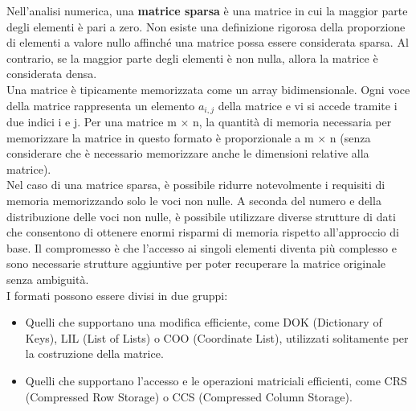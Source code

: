 Nell'analisi numerica, una \textbf{matrice sparsa} è una matrice in cui la maggior parte degli elementi è pari a zero. Non esiste una definizione rigorosa della proporzione di elementi a valore nullo affinché una matrice possa essere considerata sparsa. Al contrario, se la maggior parte degli elementi è non nulla, allora la matrice è considerata densa.
\\
Una matrice è tipicamente memorizzata come un array bidimensionale. Ogni voce della matrice rappresenta un elemento $a_{i,j}$ della matrice e vi si accede tramite i due indici i e j. Per una matrice m × n, la quantità di memoria necessaria per memorizzare la matrice in questo formato è proporzionale a m × n (senza considerare che è necessario memorizzare anche le dimensioni relative alla matrice).
\\
Nel caso di una matrice sparsa, è possibile ridurre notevolmente i requisiti di memoria memorizzando solo le voci non nulle. A seconda del numero e della distribuzione delle voci non nulle, è possibile utilizzare diverse strutture di dati che consentono di ottenere enormi risparmi di memoria rispetto all'approccio di base. Il compromesso è che l'accesso ai singoli elementi diventa più complesso e sono necessarie strutture aggiuntive per poter recuperare la matrice originale senza ambiguità.
\\
I formati possono essere divisi in due gruppi:
\begin{itemize}
	\item Quelli che supportano una modifica efficiente, come DOK (Dictionary of Keys), LIL (List of Lists) o COO (Coordinate List), utilizzati solitamente per la costruzione della matrice.
	\item Quelli che supportano l'accesso e le operazioni matriciali efficienti, come CRS (Compressed Row Storage) o CCS (Compressed Column Storage).
\end{itemize}
\\
